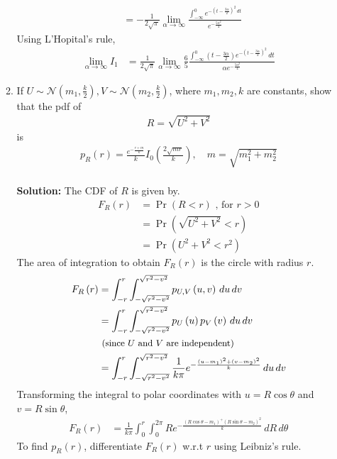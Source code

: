 \documentclass[journal,10pt,twocolumn]{IEEEtran}
\providecommand{\pr}[1]{\ensuremath{\Pr\left(#1\right)}}
\providecommand{\brak}[1]{\ensuremath{\left(#1\right)}}
\newcommand{\solution}{\noindent \textbf{Solution: }}
\begin{document}
\begin{enumerate}
\begin{enumerate}[label=(\alph{enumii})]
\begin{align}
	&= -\frac{1}{2\sqrt{\pi}} \lim_{\alpha \rightarrow \infty} \frac{\int_{-\infty}^{0} e^{-\brak{t-\frac{3\alpha}{2}}^2 \,dt}}{e^{-\frac{5\alpha^2}{4}}}
\end{align}
Using L'Hopital's rule,
\begin{align}
	\lim_{\alpha \rightarrow \infty} I_1 &= \frac{1}{2\sqrt{\pi}} \lim_{\alpha \rightarrow \infty} \frac{6}{5} \frac{\int_{-\infty}^{0} \brak{t-\frac{3\alpha}{2}} e^{-\brak{t-\frac{3\alpha}{2}}^2} \,dt}{\alpha e^{-\frac{5\alpha^2}{4}}}
\end{align}
\item 
If $U\sim\mathcal{N}\brak{m_1,\frac{k}{2}},V\sim\mathcal{N}\brak{m_2,\frac{k}{2}}$, where $m_1,m_2, k$ are constants, show that the pdf of 
%
\begin{align}
R = \sqrt{U^2+V^2}
\end{align}
%
is
%
\begin{align}
\label{eq:general_chi_sq}
p_{R}\brak{r} = \frac{e^{-\frac{r +m}{k}}}{ k}I_{0}\brak{\frac{2\sqrt{mr}}{k}},\quad m = \sqrt{m_1^2+m_2^2}
\end{align}\\
\solution The CDF of $R$ is given by.
\begin{align}
	F_{R}\brak{r} &= \pr{R < r} \text{ , for $r > 0$}\\
	&= \pr{\sqrt{U^2 + V^2} < r}\\
	&= \pr{U^2 + V^2 < r^2}
\end{align}
The area of integration to obtain $F_{R}\brak{r}$ is the circle with radius $r$.
\begin{align}
	F_{R}\brak{r} &= \int_{-r}^{r} \int_{-\sqrt{r^2-v^2}}^{\sqrt{r^2-v^2}} p_{U,V}\brak{u,v}  \,du  \,dv\\
	&= \int_{-r}^{r} \int_{-\sqrt{r^2-v^2}}^{\sqrt{r^2-v^2}} p_{U}\brak{u} p_{V}\brak{v} \,du  \,dv\\
	\nonumber
	&\text{   \small (since $U$ and $V$ are independent)}\\
	&= \int_{-r}^{r} \int_{-\sqrt{r^2-v^2}}^{\sqrt{r^2-v^2}} \frac{1}{k\pi} e^{-\frac{\brak{u-m_1}^2+\brak{v-m_2}^2}{k}} \,du  \,dv
\end{align}
Transforming the integral to polar coordinates with $u=R \cos \theta$ and $v=R \sin \theta$,
\begin{align}
	F_{R}\brak{r} &= \frac{1}{k\pi} \int_{0}^{r} \int_{0}^{2\pi} Re^{-\frac{\brak{R\cos \theta-m_1}^+\brak{R\sin \theta-m_2}^2}{k}} \,dR  \,d\theta  
\end{align}
To find $p_{R}\brak{r}$, differentiate $F_{R}\brak{r}$ w.r.t $r$ using Leibniz's rule.

\end{enumerate}
\end{enumerate}
\end{document}
